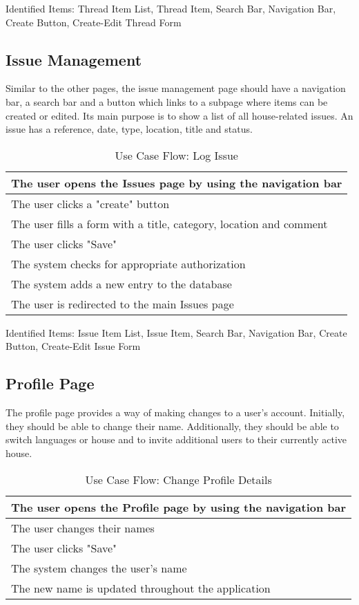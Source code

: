 Identified Items: Thread Item List, Thread Item, Search Bar, Navigation Bar, Create Button, Create-Edit Thread Form

\subsection{Issue Management}
Similar to the other pages, the issue management page should have a navigation bar, a search bar and a button which links to a subpage where items can be created or edited. Its main purpose is to show a list of all house-related issues. An issue has a reference, date, type, location, title and status.

\begin{table}[H]
  \begin{tabularx}{\linewidth}{|X|}
    \hline
     The user opens the Issues page by using the navigation bar \\
     \hline
     The user clicks a "create" button \\
     \hline
     The user fills a form with a title, category, location and comment \\
     \hline
     The user clicks "Save" \\
     \hline
     The system checks for appropriate authorization \\
     \hline
     The system adds a new entry to the database \\
     \hline
     The user is redirected to the main Issues page \\
     \hline 
  \end{tabularx}
  \caption{Use Case Flow: Log Issue}
\end{table}

Identified Items: Issue Item List, Issue Item, Search Bar, Navigation Bar, Create Button, Create-Edit Issue Form

\subsection{Profile Page}
The profile page provides a way of making changes to a user's account. Initially, they should be able to change their name. Additionally, they should be able to switch languages or house and to invite additional users to their currently active house. \newline

\begin{table}[H]
  \begin{tabularx}{\linewidth}{|X|}
    \hline
     The user opens the Profile page by using the navigation bar \\
     \hline
     The user changes their names \\
     \hline
     The user clicks "Save" \\
     \hline
     The system changes the user's name \\
     \hline 
     The new name is updated throughout the application \\
     \hline 
  \end{tabularx}
  \caption{Use Case Flow: Change Profile Details}
\end{table}


